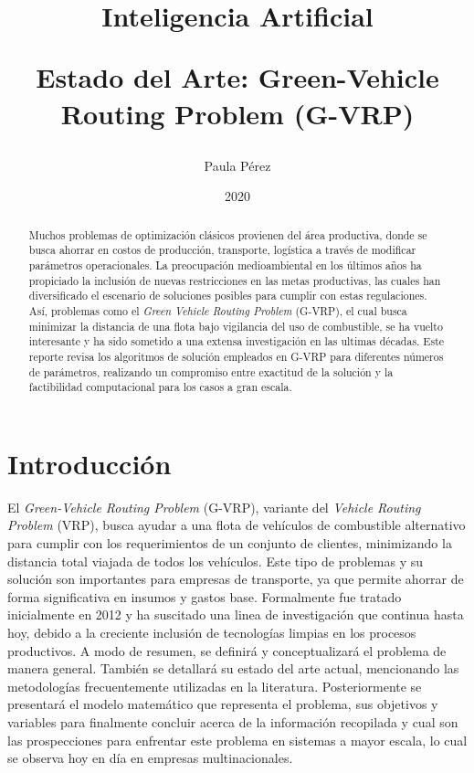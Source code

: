\documentclass[letter, 10pt]{article}
\begin{document}
\title{Inteligencia Artificial \\ \begin{Large}Estado del Arte: Green-Vehicle Routing Problem (G-VRP)\end{Large}}
\author{Paula Pérez}
\date{2020}
\maketitle


\begin{abstract}
Muchos problemas de optimización clásicos provienen del área productiva, donde se busca ahorrar en costos de producción, transporte, logística a través de modificar parámetros operacionales. La preocupación medioambiental en los últimos años ha propiciado la inclusión de nuevas restricciones en las metas productivas, las cuales han diversificado el escenario de soluciones posibles para cumplir con estas regulaciones. Así, problemas como el \textit{Green Vehicle Routing Problem} (G-VRP), el cual busca minimizar la distancia de una flota bajo vigilancia del uso de combustible, se ha vuelto interesante y ha sido sometido a una extensa investigación en las ultimas décadas. Este reporte revisa los algoritmos de solución empleados en G-VRP para diferentes números de parámetros, realizando un compromiso entre exactitud de la solución y la factibilidad computacional para los casos a gran escala. 

\end{abstract}

\section{Introducci\'on}
El \textit{Green-Vehicle Routing Problem} (G-VRP), variante del \textit{Vehicle Routing Problem} (VRP), busca ayudar a una flota de vehículos de combustible alternativo para cumplir con los requerimientos de un conjunto de clientes, minimizando la distancia total viajada de todos los vehículos. Este tipo de problemas y su solución son importantes para empresas de transporte, ya que permite ahorrar de forma significativa en insumos y gastos base. Formalmente fue tratado inicialmente en 2012 y ha suscitado una linea de investigación que continua hasta hoy, debido a la creciente inclusión de tecnologías limpias en los procesos productivos. A modo de resumen, se definirá y conceptualizará el problema de manera general. También se detallará su estado del arte actual, mencionando las metodologías frecuentemente utilizadas en la literatura. Posteriormente se presentará el modelo matemático que representa el problema, sus objetivos y variables para finalmente concluir acerca de la información recopilada y cual son las prospecciones para enfrentar este problema en sistemas a mayor escala, lo cual se observa hoy en día en empresas multinacionales.
\end{document}
